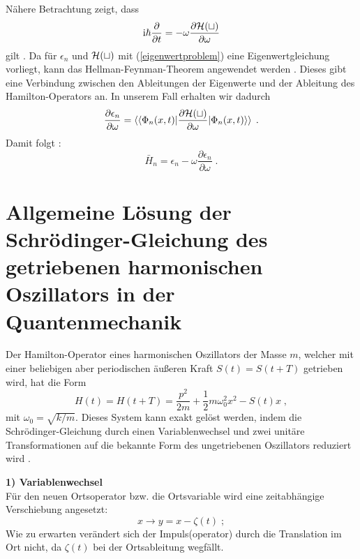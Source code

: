     Nähere Betrachtung zeigt, dass
    \begin{equation}
      \text{i}\hbar\frac{\partial}{\partial t} = -\omega \frac{\partial \cal{H}(t)}{\partial \omega}
    \end{equation}
    gilt \cite{haenggi}.
    Da für $\epsilon_n$ und $\cal H(t)$ mit (\ref{eigenwertproblem}) eine Eigenwertgleichung vorliegt, kann das Hellman-Feynman-Theorem angewendet werden \cite{hellmann online quelle}.
    Dieses gibt eine Verbindung zwischen den Ableitungen der Eigenwerte und der Ableitung des Hamilton-Operators an.
    In unserem Fall erhalten wir dadurch
    \begin{equation}
      \frac{\partial \epsilon_n}{\partial \omega} = \braket{\braket{\Phi_n(x,t)|\frac{\partial \cal H(t)}{\partial \omega}|\Phi_n(x,t)}} \; .
    \end{equation}
    Damit folgt \cite{haenggi}:
    \begin{equation}
      \bar{H}_n = \epsilon_n - \omega\frac{\partial \epsilon_n}{\partial \omega} \; .
      \label{mittleres_H}
    \end{equation}

  \newpage



  \section{Allgemeine Lösung der Schrödinger-Gleichung des getriebenen harmonischen Oszillators in der Quantenmechanik}
    \label{lsg_einzelner}
    Der Hamilton-Operator eines harmonischen Oszillators der Masse $m$, welcher mit einer beliebigen aber periodischen äußeren Kraft $S(t)=S(t+T)$ getrieben wird, hat die Form
    \begin{equation}
      H(t) = H(t+T) = \frac{p^2}{2m} + \frac{1}{2}m\omega_0^2x^2-S(t)x \; ,
    \end{equation}
    mit $\omega_0=\sqrt{k/m}$.
    Dieses System kann exakt gelöst werden, indem die Schrödinger-Gleichung durch einen Variablenwechsel und zwei unitäre Transformationen auf die bekannte Form des ungetriebenen Oszillators reduziert wird \cite{haenggi}.

    \textbf{1) Variablenwechsel}\\
    Für den neuen Ortsoperator bzw. die Ortsvariable wird eine zeitabhängige Verschiebung angesetzt:
    \begin{equation}
      x \rightarrow y=x-\zeta(t) \; ;
    \end{equation}
    Wie zu erwarten verändert sich der Impuls(operator) durch die Translation im Ort nicht, da $\zeta(t)$ bei der Ortsableitung wegfällt.

